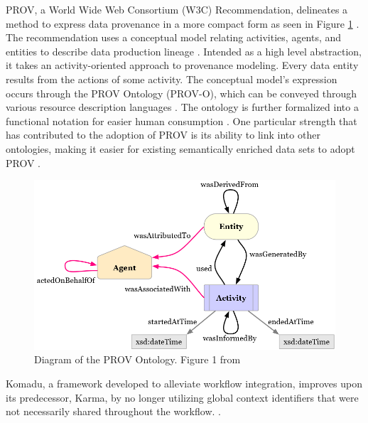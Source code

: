 PROV, a World Wide Web Consortium (W3C) Recommendation, delineates a method to express data provenance in a more compact form as seen in Figure \ref{PROVO} \cite{Gil2013a} \cite{Groth2013}.
The recommendation uses a conceptual model relating activities, agents, and entities to describe data production lineage \cite{Moreau2013c} \cite{Nies2013} \cite{Nies2013a}.
Intended as a high level abstraction, it takes an activity-oriented approach to provenance modeling.
Every data entity results from the actions of some activity.
The conceptual model's expression occurs through the PROV Ontology (PROV-O), which can be conveyed through various resource description languages \cite{Hua2013} \cite{Klyne2013}.
The ontology is further formalized into a functional notation for easier human consumption \cite{Moreau2013b} \cite{Cheney2013a}.
One particular strength that has contributed to the adoption of PROV is its ability to link into other ontologies, making it easier for existing semantically enriched data sets to adopt PROV \cite{Miles2013} \cite{Moreau2013}.
\begin{figure}
	\centering
	\includegraphics[scale=0.5]{figures/ProvO.png}
	\caption[Diagram of the PROV Ontology.]{Diagram of the PROV Ontology.  Figure 1 from \cite{Lebo2013}}
	\label{PROVO}
\end{figure}
Komadu, a framework developed to alleviate workflow integration, improves upon its predecessor, Karma, by no longer utilizing global context identifiers that were not necessarily shared throughout the workflow. \cite{Suriarachchi_2015}.



